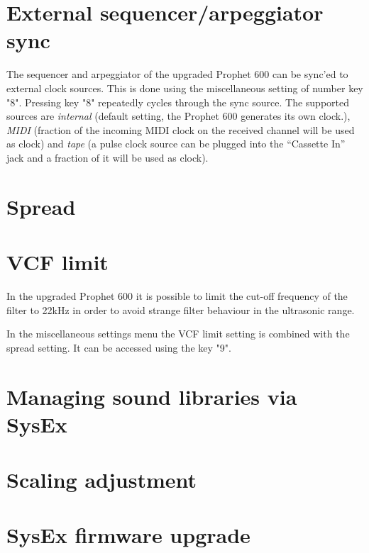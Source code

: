 \documentclass[draft,landscape, 11pt, oneside]{report}
\newenvironment{flowtext}{\addmargin[0cm]{7cm}}{\endaddmargin} %
\begin{document}
\begin{flowtext}
\section{External sequencer/arpeggiator sync}\label{sync}

The sequencer and arpeggiator of the upgraded Prophet 600 can be sync'ed to external clock sources. This is done using the miscellaneous setting of number key "8". Pressing key "8" repeatedly cycles through the sync source. The supported sources are \textit{internal} (default setting, the Prophet 600 generates its own clock.), \textit{MIDI} (fraction of the incoming MIDI clock on the received channel will be used as clock) and \textit{tape} (a pulse clock source can be plugged into the “Cassette In” jack and a fraction of it will be used as clock).

\section{Spread}\label{spreadsett}



\section{VCF limit}\label{limitsett}

In the upgraded Prophet 600 it is possible to limit the cut-off frequency of the filter to 22kHz in order to avoid strange filter behaviour in the ultrasonic range.

In the miscellaneous settings menu the VCF limit setting is combined with the spread setting. It can be accessed using the key "9".  

\section{Managing sound libraries via SysEx}\label{mididump}



\section{Scaling adjustment}\label{maintenance}



\section{SysEx firmware upgrade}\label{fwupgrade}


\end{flowtext}
\end{document}
